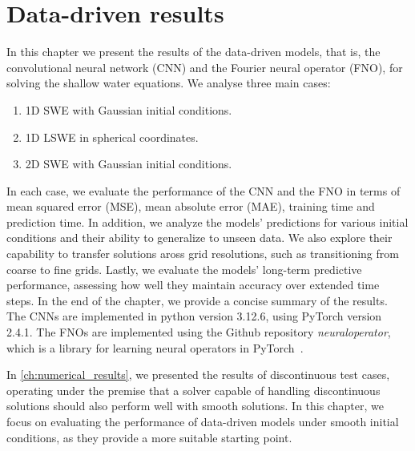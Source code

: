 \chapter{Data-driven results}\label{ch:data-driven-results}
In this chapter we present the results of the data-driven models, that is, the convolutional neural network (CNN) and the Fourier neural operator (FNO), for solving the shallow water equations.
We analyse three main cases:
\begin{enumerate}
    \item 1D SWE with Gaussian initial conditions. 
    \item 1D LSWE in spherical coordinates.
    \item 2D SWE with Gaussian initial conditions.
\end{enumerate}
In each case, we evaluate the performance of the CNN and the FNO in terms of mean squared error (MSE), mean absolute error (MAE), training time and prediction time.
In addition, we analyze the models' predictions for various initial conditions and their ability to generalize to unseen data.
We also explore their capability to transfer solutions aross grid resolutions, such as transitioning from coarse to fine grids.
Lastly, we evaluate the models' long-term predictive performance, assessing how well they maintain accuracy over extended time steps.
In the end of the chapter, we provide a concise summary of the results.
The CNNs are implemented in python version 3.12.6, using PyTorch version 2.4.1.
The FNOs are implemented using the Github repository \textit{neuraloperator}, which is a library for learning neural operators in PyTorch~\cite{neuraloperator}.

In \autoref{ch:numerical_results}, we presented the results of discontinuous test cases, operating under the premise that a solver capable of handling discontinuous solutions should also perform well with smooth solutions.
In this chapter, we focus on evaluating the performance of data-driven models under smooth initial conditions, as they provide a more suitable starting point.

